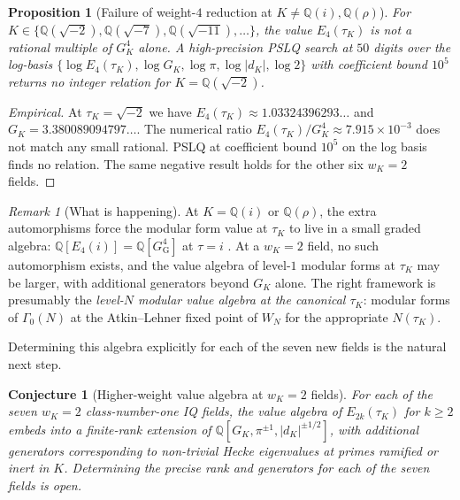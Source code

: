 \documentclass[11pt]{amsart}
\theoremstyle{plain}
\newtheorem{proposition}[theorem]{Proposition}
\newtheorem{conjecture}[theorem]{Conjecture}
\theoremstyle{definition}
\theoremstyle{remark}
\newtheorem*{remark}{Remark}
\newcommand{\GG}{G_{\!\scriptscriptstyle\mathrm{G}}}
\newcommand{\GK}{G_{K}}
\newcommand{\Q}{\mathbb{Q}}
\begin{document}
\begin{proposition}[Failure of weight-$4$ reduction at $K \neq \Q(i), \Q(\rho)$]\label{prop:higher-weight}
For $K \in \{\Q(\sqrt{-2}), \Q(\sqrt{-7}), \Q(\sqrt{-11}), \ldots\}$, the value $E_{4}(\tau_K)$
is \emph{not} a rational multiple of $\GK^{4}$ alone. A high-precision PSLQ
search at $50$ digits over the log-basis
$\{\log E_4(\tau_K), \log \GK, \log\pi, \log|d_K|, \log 2\}$ with
coefficient bound $10^{5}$ returns no integer relation for $K = \Q(\sqrt{-2})$.
\end{proposition}

\begin{proof}[Empirical]
At $\tau_K = \sqrt{-2}$ we have $E_{4}(\tau_K) \approx 1.03324396293\ldots$
and $\GK = 3.380089094797\ldots$. The numerical ratio
$E_{4}(\tau_K)/\GK^{4} \approx 7.915\times 10^{-3}$ does not match any
small rational. PSLQ at coefficient bound $10^{5}$ on the log basis
finds no relation. The same negative result holds for the other six
$w_K = 2$ fields.
\end{proof}

\begin{remark}[What is happening]
At $K = \Q(i)$ or $\Q(\rho)$, the extra automorphisms force the modular
form value at $\tau_K$ to live in a small graded algebra:
$\Q[E_{4}(i)] = \Q[\GG^{4}]$ at $\tau = i$ \cite[Thm 12.2]{paper-gstar-A}.
At a $w_K = 2$ field, no such automorphism exists, and the value algebra
of level-$1$ modular forms at $\tau_K$ may be larger, with additional
generators beyond $\GK$ alone. The right framework is presumably the
\emph{level-$N$ modular value algebra at the canonical $\tau_K$}:
modular forms of $\Gamma_0(N)$ at the Atkin--Lehner fixed point of $W_N$
for the appropriate $N(\tau_K)$.

Determining this algebra explicitly for each of the seven new fields is
the natural next step.
\end{remark}

\begin{conjecture}[Higher-weight value algebra at $w_K = 2$ fields]\label{conj:higher-weight}
For each of the seven $w_K = 2$ class-number-one IQ fields, the value
algebra of $E_{2k}(\tau_K)$ for $k \geq 2$ embeds into a finite-rank
extension of $\Q[\GK, \pi^{\pm 1}, |d_K|^{\pm 1/2}]$, with additional
generators corresponding to non-trivial Hecke eigenvalues at primes
ramified or inert in $K$. Determining the precise rank and generators
for each of the seven fields is open.
\end{conjecture}
\end{document}

